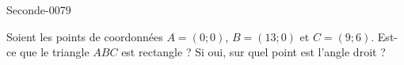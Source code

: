 
\begin{corrige}{Seconde-0079}

    Soient les points de coordonnées $A=(0;0)$, \( B=(13;0)\) et \( C=(9;6)\). Est-ce que le triangle \( ABC\) est rectangle ? Si oui, sur quel point est l'angle droit ?

\end{corrige}
